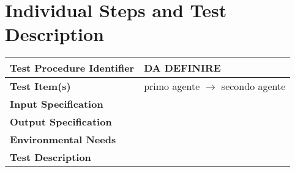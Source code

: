 \section{Individual Steps and Test Description}


\begin{tabular}{l p{}}
    \hline
    \textbf{Test Procedure Identifier} & DA DEFINIRE \\
    \hline
    \textbf{Test Item(s)} & primo agente  $\rightarrow$ secondo agente \\
    \hline
    \textbf{Input Specification} & \\
    \hline
    \textbf{Output Specification} & \\
    \hline
    \textbf{Environmental Needs} &  \\
    \hline
    \textbf{Test Description} & \\
    \hline
\end{tabular}


